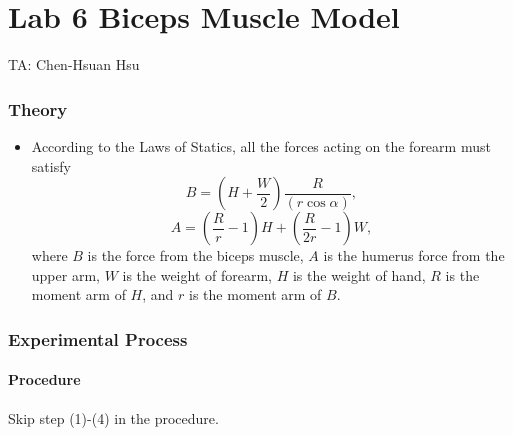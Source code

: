 \documentclass{article}
\begin{document}
\part*{Lab 6 Biceps Muscle Model}
TA: Chen-Hsuan Hsu\\
\vspace{-0.3in}
\section*{Theory}
\begin{itemize}
\item According to the Laws of Statics, all the forces acting on the forearm must satisfy 
\begin{equation}\label{eq1}
B = (H+ \frac{W}{2}) \frac{R}{(r \cos \alpha)},
\end{equation}
\begin{equation}\label{eq2}
A = (\frac{R}{r}-1)H+(\frac{R}{2r}-1)W,
\end{equation}
where $B$ is the force from the biceps muscle, $A$ is the humerus force from the upper arm, $W$ is the weight of forearm, $H$ is the weight of hand, $R$ is the moment arm of $H$, and $r$ is the moment arm of $B$. 

\end{itemize}

\section*{Experimental Process}

\subsection*{Procedure}
Skip step (1)-(4) in the procedure.
\end{document}
